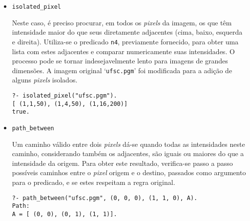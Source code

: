 \documentclass{article}
\begin{document}
\begin{itemize}
\item \texttt{isolated\_pixel}

Neste caso, é preciso procurar, em todos os \textit{pixels} da imagem, os que
têm intensidade maior do que seus diretamente adjacentes (cima, baixo,
esquerda e direita). Utiliza-se o predicado \texttt{n4}, previamente fornecido,
para obter uma lista com estes adjacentes e comparar numericamente suas
intensidades. O processo pode se tornar indesejavelmente lento para imagens
de grandes dimensões. A imagem original `\texttt{ufsc.pgm}' foi modificada para
a adição de alguns \textit{pixels} isolados.
\begin{verbatim}
?- isolated_pixel("ufsc.pgm").
[ (1,1,50), (1,4,50), (1,16,200)]
true.
\end{verbatim}

\item \texttt{path\_between}

Um caminho válido entre dois \textit{pixels} dá-se quando todas as intensidades
neste caminho, considerando também os adjacentes, são iguais ou maiores do que
a intensidade da origem. Para obter este resultado, verifica-se passo a passo
possíveis caminhos entre o \textit{pixel} origem e o destino, passados como
argumento para o predicado, e se estes respeitam a regra original.
\begin{verbatim}
?- path_between("ufsc.pgm", (0, 0, 0), (1, 1, 0), A).
Path:
A = [ (0, 0), (0, 1), (1, 1)].
\end{verbatim}

\end{itemize}
\end{document}
